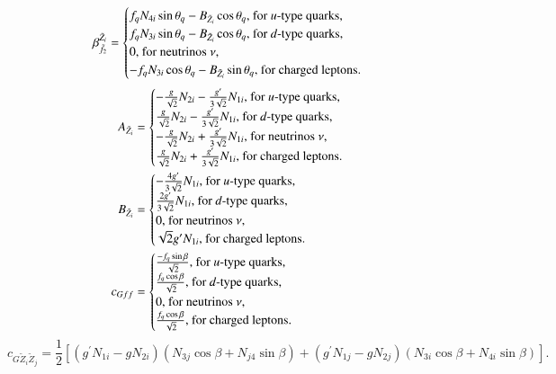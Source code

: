 \documentclass[final,3p,times]{elsarticle}
\begin{document}
\begin{equation}
{\beta_{\tilde{f}_2}^{\tilde{Z}_i}} = \begin{cases}
f_{q}N_{4i}\sin\theta_q - B_{\tilde{Z}_i}\cos\theta_q, $ for $u$-type quarks,$ \\
f_{q}N_{3i}\sin\theta_q - B_{\tilde{Z}_i}\cos\theta_q, $ for $d$-type quarks,$ \\
0, $ for neutrinos $ \nu$,$ \\
-f_{q}N_{3i}\cos\theta_q - B_{\tilde{Z}_i}\sin\theta_q, $ for charged leptons$. 
\end{cases}
\end{equation}
\begin{align}
{A_{\tilde{Z}_i}} &= \begin{cases}
-{g \over \sqrt{2}}N_{2i} - {g' \over 3 \sqrt{2}}N_{1i}, $ for $u$-type quarks,$ \\
{g \over \sqrt{2}}N_{2i} - {g' \over 3 \sqrt{2}}N_{1i}, $ for $d$-type quarks,$ \\
-{g \over \sqrt{2}}N_{2i} + {g' \over 3 \sqrt{2}}N_{1i}, $ for neutrinos $ \nu$,$ \\
{g \over \sqrt{2}}N_{2i} + {g' \over 3 \sqrt{2}}N_{1i}, $ for charged leptons$. 
\end{cases} \\
{B_{\tilde{Z}_i}} &= \begin{cases}
-{4 g' \over 3 \sqrt{2}}N_{1i}, $ for $u$-type quarks,$ \\
{2 g' \over 3 \sqrt{2}}N_{1i}, $ for $d$-type quarks,$ \\
0, $ for neutrinos $ \nu $,$\\
\sqrt{2}g' N_{1i}, $ for charged leptons$. 
\end{cases} \\
c_{G f f} &= \begin{cases}
{-f_{q} \sin\beta \over \sqrt{2}}, $ for $u$-type quarks,$ \\
{f_{q} \cos\beta \over \sqrt{2}}, $ for $d$-type quarks,$ \\
{0}, $ for neutrinos $ \nu$,$ \\
{f_{q} \cos\beta \over \sqrt{2}}, $ for charged leptons$. 
\end{cases}
\end{align}
\begin{equation}
c_{G \tilde{Z}_i \tilde{Z}_j} = \frac{1}{2}\left[(g^{'}N_{1i} - g N_{2i})(N_{3j} \cos\beta + N_{j4}\sin\beta) + (g^{'} N_{1j} - gN_{2j})(N_{3i}\cos\beta + N_{4i}\sin\beta)\right].
\end{equation}
\end{document}
